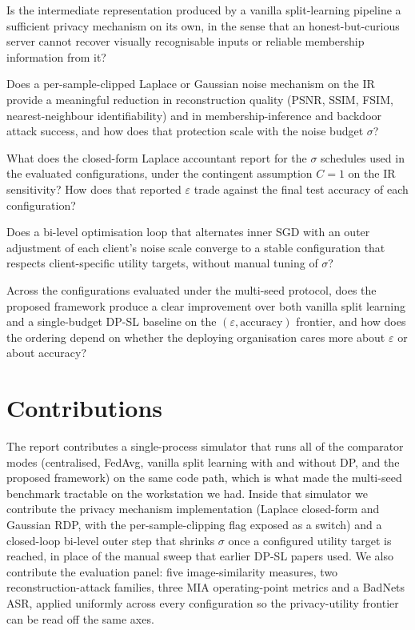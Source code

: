 \documentclass[11pt,a4paper,oneside]{report}
\begin{document}
\begin{description}[style=nextline,itemsep=4pt]
 \item[\textbf{RQ1.}] Is the intermediate representation produced by
 a vanilla split-learning pipeline a sufficient privacy
 mechanism on its own, in the sense that an honest-but-curious
 server cannot recover visually recognisable inputs or reliable
 membership information from it?
 \item[\textbf{RQ2.}] Does a per-sample-clipped Laplace or Gaussian
 noise mechanism on the IR provide a meaningful reduction in
 reconstruction quality (PSNR, SSIM, FSIM, nearest-neighbour
 identifiability) and in membership-inference and backdoor
 attack success, and how does that protection scale with the
 noise budget $\sigma$?
 \item[\textbf{RQ3.}] What does the closed-form Laplace
 accountant report for the $\sigma$ schedules used in the
 evaluated configurations, under the contingent assumption
 $C{=}1$ on the IR sensitivity? How does that reported
 $\varepsilon$ trade against the final test accuracy of each
 configuration?
 \item[\textbf{RQ4.}] Does a bi-level optimisation loop that
 alternates inner SGD with an outer adjustment of each client's
 noise scale converge to a stable configuration that respects
 client-specific utility targets, without manual tuning of
 $\sigma$?
 \item[\textbf{RQ5.}] Across the configurations evaluated under
 the multi-seed protocol, does the proposed framework produce
 a clear improvement over both vanilla split learning and a
 single-budget DP-SL baseline on the
 $(\varepsilon, \text{accuracy})$ frontier, and how does the
 ordering depend on whether the deploying organisation cares
 more about $\varepsilon$ or about accuracy?
\end{description}

\section{Contributions}

The report contributes a single-process simulator that runs all of
the comparator modes (centralised, FedAvg, vanilla split learning
with and without DP, and the proposed framework) on the same code
path, which is what made the multi-seed benchmark tractable on the
workstation we had. Inside that simulator we contribute the privacy
mechanism implementation (Laplace closed-form and Gaussian RDP, with
the per-sample-clipping flag exposed as a switch) and a closed-loop
bi-level outer step that shrinks $\sigma$ once a configured utility
target is reached, in place of the manual sweep that earlier DP-SL
papers used. We also contribute the evaluation panel: five
image-similarity measures, two reconstruction-attack families, three
MIA operating-point metrics and a BadNets ASR, applied uniformly
across every configuration so the privacy-utility frontier can be
read off the same axes.
\end{document}

